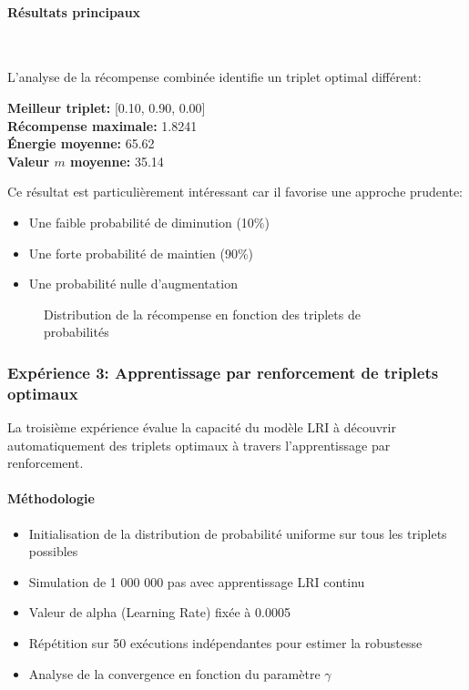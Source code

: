 \paragraph{Résultats principaux}\

L'analyse de la récompense combinée identifie un triplet optimal différent:
\begin{mdframed}
\textbf{Meilleur triplet:} [0.10, 0.90, 0.00]\\
\textbf{Récompense maximale:} 1.8241\\
\textbf{Énergie moyenne:} 65.62\\
\textbf{Valeur $m$ moyenne:} 35.14
\end{mdframed}

Ce résultat est particulièrement intéressant car il favorise une approche prudente:
\begin{itemize}
    \item Une faible probabilité de diminution (10\%)
    \item Une forte probabilité de maintien (90\%)
    \item Une probabilité nulle d'augmentation
\end{itemize}

\begin{figure}[h]
    \centering
    \caption{Distribution de la récompense en fonction des triplets de probabilités}
    \label{fig:recompense_3d}
\end{figure}

\subsubsection{Expérience 3: Apprentissage par renforcement de triplets optimaux}

La troisième expérience évalue la capacité du modèle LRI à découvrir automatiquement des triplets optimaux à travers l'apprentissage par renforcement.


\paragraph{Méthodologie}
\begin{itemize}
    \item Initialisation de la distribution de probabilité uniforme sur tous les triplets possibles
    \item Simulation de 1 000 000 pas avec apprentissage LRI continu
    \item Valeur de alpha (Learning Rate) fixée à 0.0005
    \item Répétition sur 50 exécutions indépendantes pour estimer la robustesse
    \item Analyse de la convergence en fonction du paramètre $\gamma$
\end{itemize}


